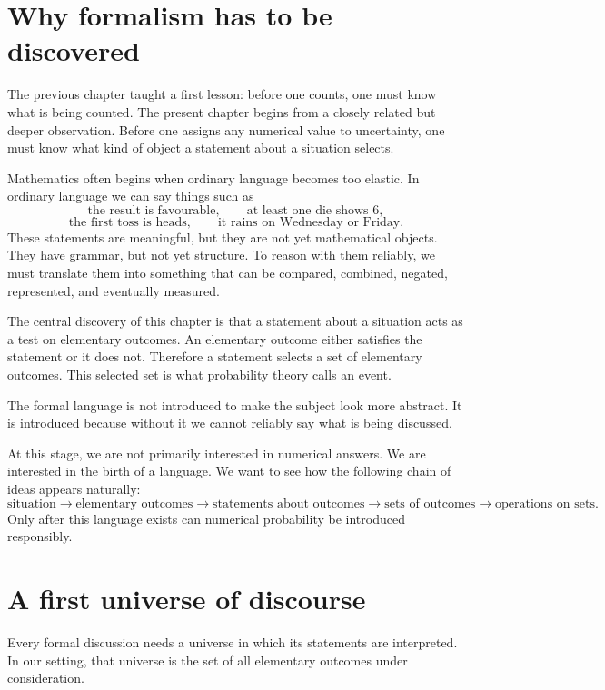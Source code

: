 \section{Why formalism has to be discovered}

The previous chapter taught a first lesson: before one counts, one must know what is being counted. The present chapter begins from a closely related but deeper observation. Before one assigns any numerical value to uncertainty, one must know what kind of object a statement about a situation selects.

Mathematics often begins when ordinary language becomes too elastic. In ordinary language we can say things such as
\[
\text{the result is favourable},\qquad
\text{at least one die shows }6,
\]
\[
\text{the first toss is heads},\qquad
\text{it rains on Wednesday or Friday}.
\]
These statements are meaningful, but they are not yet mathematical objects. They have grammar, but not yet structure. To reason with them reliably, we must translate them into something that can be compared, combined, negated, represented, and eventually measured.

The central discovery of this chapter is that a statement about a situation acts as a test on elementary outcomes. An elementary outcome either satisfies the statement or it does not. Therefore a statement selects a set of elementary outcomes. This selected set is what probability theory calls an event.

\begin{remarkbox}
The formal language is not introduced to make the subject look more abstract. It is introduced because without it we cannot reliably say what is being discussed.
\end{remarkbox}

At this stage, we are not primarily interested in numerical answers. We are interested in the birth of a language. We want to see how the following chain of ideas appears naturally:
\[
\text{situation}
\longrightarrow
\text{elementary outcomes}
\longrightarrow
\text{statements about outcomes}
\longrightarrow
\text{sets of outcomes}
\longrightarrow
\text{operations on sets}.
\]
Only after this language exists can numerical probability be introduced responsibly.

\section{A first universe of discourse}

Every formal discussion needs a universe in which its statements are interpreted. In our setting, that universe is the set of all elementary outcomes under consideration.

